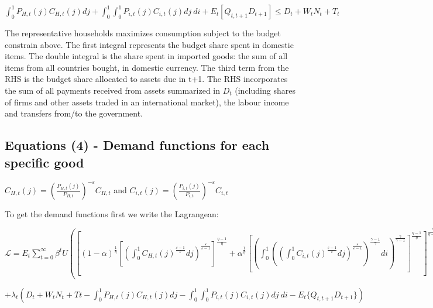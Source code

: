\documentclass[
]{article}
\begin{document}
\vspace{8pt}

\(\displaystyle \int_0^1 P_{H,t}(j)C_{H,t}(j)dj + \int_0^1\int_0^1 P_{i,t}(j)C_{i,t}(j)dj\ di + E_t[ Q_{t,t+1}D_{t+1}] \leq D_t + W_tN_t + T_t\)

The representative households maximizes consumption subject to the
budget constrain above. The first integral represents the budget share
spent in domestic items. The double integral is the share spent in
imported goods: the sum of all items from all countries bought, in
domestic currency. The third term from the RHS is the budget share
allocated to assets due in t+1. The RHS incorporates the sum of all
payments received from assets summarized in \(D_t\) (including shares of
firms and other assets traded in an international market), the labour
income and transfers from/to the government.

\vspace{12pt}

\hypertarget{equations-4---demand-functions-for-each-specific-good}{%
\subsection{Equations (4) - Demand functions for each specific
good}\label{equations-4---demand-functions-for-each-specific-good}}

\(\displaystyle C_{H,t}(j)= \left( \frac{P_{H,t}(j)}{P_{H,t}}\right)^{-\varepsilon}C_{H,t}\)
and
\(\displaystyle C_{i,t}(j)= \left( \frac{P_{i,t}(j)}{P_{i,t}}\right)^{-\varepsilon}C_{i,t}\)

\vspace{8pt}

To get the demand functions first we write the Lagrangean:

\(\mathcal{L} = \displaystyle E_t \sum_{t=0}^\infty \beta^t U \left(\left[ (1-\alpha)^{\frac{1}{\eta}} \left [\displaystyle \left( \int_0^1 C_{H,t}(j)^{\frac{\varepsilon-1}{\varepsilon}}dj \right) ^{\frac{\varepsilon}{\varepsilon-1}} \right]^{\frac{\eta-1}{\eta}} + \alpha^{\frac{1}{\eta}} \left[ \displaystyle \left( \int_0^1 \left( \displaystyle \left( \int_0^1 C_{i,t}(j)^{\frac{\varepsilon-1}{\varepsilon}}dj \right) ^{\frac{\varepsilon}{\varepsilon-1}} \right)^{\frac{\gamma-1}{\gamma}}di \right) ^{\frac{\gamma}{\gamma-1}} \right]^{\frac{\eta-1}{\eta}} \right]^{\frac{\eta}{\eta-1}},N_t \right)\)

\(+ \lambda_t \left(D_t + W_tN_t + Tt \displaystyle - \int_0^1 P_{H,t}(j)C_{H,t}(j)dj - \int_0^1\int_0^1 P_{i,t}(j)C_{i,t}(j)dj\ di - E_t\{ Q_{t,t+1}D_{t+1}\}\right)\)
\end{document}
